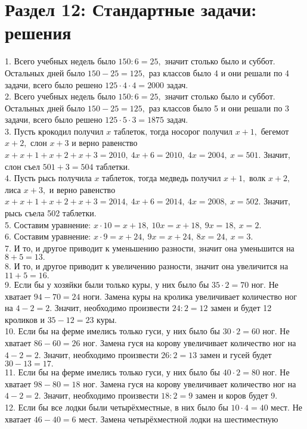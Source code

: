\section{Раздел 12: Стандартные задачи: решения}
1. Всего учебных недель было $150:6=25,$ значит столько было и суббот. Остальных дней было $150-25=125,$ раз классов было 4 и они решали по 4 задачи, всего было решено $125\cdot4\cdot4=2000$ задач.\\
2. Всего учебных недель было $150:6=25,$ значит столько было и суббот. Остальных дней было $150-25=125,$ раз классов было 5 и они решали по 3 задачи, всего было решено $125\cdot5\cdot3=1875$ задач.\\
3. Пусть крокодил получил $x$ таблеток, тогда носорог получил $x+1,$ бегемот $x+2,$ слон $x+3$ и верно равенство $x+x+1+x+2+x+3=2010,\ 4x+6=2010,\ 4x=2004,\ x=501.$ Значит, слон съел $501+3=504$ таблетки.\\
4. Пусть рысь получила $x$ таблеток, тогда медведь получил $x+1,$ волк $x+2,$ лиса $x+3,$ и верно равенство $x+x+1+x+2+x+3=2014,\ 4x+6=2014,\ 4x=2008,\ x=502.$ Значит, рысь съела 502 таблетки.\\
5. Составим уравнение: $x\cdot10=x+18,\ 10x=x+18,\ 9x=18,\ x=2.$\\
6. Составим уравнение: $x\cdot9=x+24,\ 9x=x+24,\ 8x=24,\ x=3.$\\
7. И то, и другое приводит к уменьшению разности, значит она уменьшится на $8+5=13.$\\
8. И то, и другое приводит к увеличению разности, значит она увеличится на $11+5=16.$\\
9. Если бы у хозяйки были только куры, у них было бы $35\cdot2=70$ ног. Не хватает $94-70=24$ ноги. Замена куры на кролика увеличивает количество ног на $4-2=2.$ Значит, необходимо произвести $24:2=12$ замен и будет 12 кроликов и $35-12=23$ куры.\\
10. Если бы на ферме имелись только гуси, у них было бы  $30\cdot2=60$ ног. Не хватает $86-60=26$ ног. Замена гуся на корову увеличивает количество ног на $4-2=2.$
Значит, необходимо произвести $26:2=13$ замен и гусей будет $30-13=17.$\\
11. Если бы на ферме имелись только гуси, у них было бы  $40\cdot2=80$ ног. Не хватает $98-80=18$ ног. Замена гуся на корову увеличивает количество ног на $4-2=2.$
Значит, необходимо произвести $18:2=9$ замен и коров будет 9.\\
12. Если бы все лодки были четырёхместные, в них было бы $10\cdot4=40$ мест. Не хватает $46-40=6$ мест. Замена четырёхместной лодки на шестиместную
